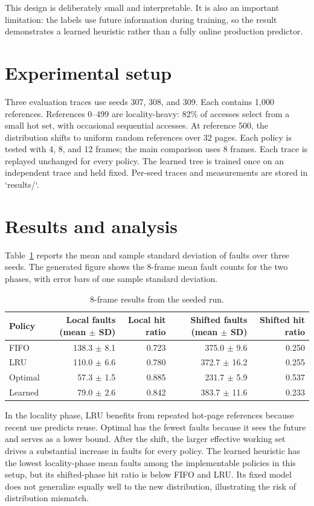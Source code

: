 \documentclass[10pt,a4paper]{article}
\begin{document}
This design is deliberately small and interpretable. It is also an important limitation: the labels use future information during training, so the result demonstrates a learned heuristic rather than a fully online production predictor.

\section{Experimental setup}
Three evaluation traces use seeds 307, 308, and 309. Each contains 1,000 references. References 0--499 are locality-heavy: 82\% of accesses select from a small hot set, with occasional sequential accesses. At reference 500, the distribution shifts to uniform random references over 32 pages. Each policy is tested with 4, 8, and 12 frames; the main comparison uses 8 frames. Each trace is replayed unchanged for every policy. The learned tree is trained once on an independent trace and held fixed. Per-seed traces and measurements are stored in `results/`.

\section{Results and analysis}
Table~\ref{tab:results} reports the mean and sample standard deviation of faults over three seeds. The generated figure shows the 8-frame mean fault counts for the two phases, with error bars of one sample standard deviation.

\begin{table}[h]
\centering
\caption{8-frame results from the seeded run.}
\label{tab:results}
\begin{tabular}{lrrrr}
\toprule
Policy & Local faults (mean $\pm$ SD) & Local hit ratio & Shifted faults (mean $\pm$ SD) & Shifted hit ratio\\
\midrule
FIFO & 138.3 $\pm$ 8.1 & 0.723 & 375.0 $\pm$ 9.6 & 0.250 \\
LRU & 110.0 $\pm$ 6.6 & 0.780 & 372.7 $\pm$ 16.2 & 0.255 \\
Optimal & 57.3 $\pm$ 1.5 & 0.885 & 231.7 $\pm$ 5.9 & 0.537 \\
Learned & 79.0 $\pm$ 2.6 & 0.842 & 383.7 $\pm$ 11.6 & 0.233 \\
\bottomrule
\end{tabular}
\end{table}

In the locality phase, LRU benefits from repeated hot-page references because recent use predicts reuse. Optimal has the fewest faults because it sees the future and serves as a lower bound. After the shift, the larger effective working set drives a substantial increase in faults for every policy. The learned heuristic has the lowest locality-phase mean faults among the implementable policies in this setup, but its shifted-phase hit ratio is below FIFO and LRU. Its fixed model does not generalize equally well to the new distribution, illustrating the risk of distribution mismatch.
\end{document}

